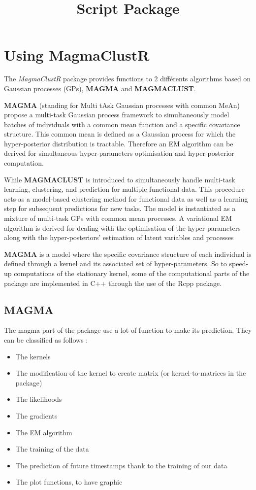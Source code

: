 \documentclass[
]{article}
\title{Script Package}
\author{}
\date{\vspace{-2.5em}}
\providecommand{\tightlist}{%
  \setlength{\itemsep}{0pt}\setlength{\parskip}{0pt}}
\begin{document}
\maketitle

\hypertarget{using-magmaclustr}{%
\section{Using MagmaClustR}\label{using-magmaclustr}}

The \emph{MagmaClustR} package provides functions to 2 différents
algorithms based on Gaussian processes (GPs), \textbf{MAGMA} and
\textbf{MAGMACLUST}.

\textbf{MAGMA} (standing for Multi tAsk Gaussian processes with common
MeAn) propose a multi-task Gaussian process framework to simultaneously
model batches of individuals with a common mean function and a specific
covariance structure. This common mean is defined as a Gaussian process
for which the hyper-posterior distribution is tractable. Therefore an EM
algorithm can be derived for simultaneous hyper-parameters optimisation
and hyper-posterior computation.

While \textbf{MAGMACLUST} is introduced to simultaneously handle
multi-task learning, clustering, and prediction for multiple functional
data. This procedure acts as a model-based clustering method for
functional data as well as a learning step for subsequent predictions
for new tasks. The model is instantiated as a mixture of multi-task GPs
with common mean processes. A variational EM algorithm is derived for
dealing with the optimisation of the hyper-parameters along with the
hyper-posteriors' estimation of latent variables and processes

\textbf{MAGMA} is a model where the specific covariance structure of
each individual is defined through a kernel and its associated set of
hyper-parameters. So to speed-up computations of the stationary kernel,
some of the computational parts of the package are implemented in C++
through the use of the Rcpp package.

\hypertarget{magma}{%
\subsection{MAGMA}\label{magma}}

The magma part of the package use a lot of function to make its
prediction. They can be classified as follows :

\begin{itemize}
\tightlist
\item
  The kernels
\item
  The modification of the kernel to create matrix (or kernel-to-matrices
  in the package)
\item
  The likelihoods
\item
  The gradients
\item
  The EM algorithm
\item
  The training of the data
\item
  The prediction of future timestamps thank to the training of our data
\item
  The plot functions, to have graphic
\end{itemize}
\end{document}
